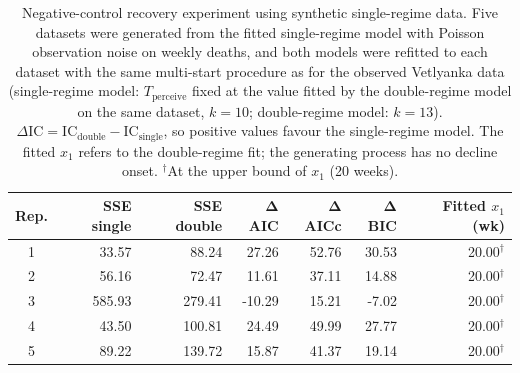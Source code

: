 \begin{table}[t]
    \centering
    \small
    \caption{Negative-control recovery experiment using synthetic single-regime data. Five datasets were generated from the fitted single-regime model with Poisson observation noise on weekly deaths, and both models were refitted to each dataset with the same multi-start procedure as for the observed Vetlyanka data (single-regime model: $T_{\mathrm{perceive}}$ fixed at the value fitted by the double-regime model on the same dataset, $k=10$; double-regime model: $k=13$). $\Delta\mathrm{IC}=\mathrm{IC}_{\mathrm{double}}-\mathrm{IC}_{\mathrm{single}}$, so positive values favour the single-regime model. The fitted $x_1$ refers to the double-regime fit; the generating process has no decline onset. $^{\dagger}$At the upper bound of $x_1$ (20 weeks).}
    \begin{tabular}{crrrrrr}
        \toprule
        \textbf{Rep.} & \textbf{SSE single} & \textbf{SSE double} & $\boldsymbol{\Delta}$\textbf{AIC} & $\boldsymbol{\Delta}$\textbf{AICc} & $\boldsymbol{\Delta}$\textbf{BIC} & \textbf{Fitted $x_1$ (wk)} \\
        \midrule
        1 & 33.57 & 88.24 & 27.26 & 52.76 & 30.53 & 20.00$^{\dagger}$ \\
        2 & 56.16 & 72.47 & 11.61 & 37.11 & 14.88 & 20.00$^{\dagger}$ \\
        3 & 585.93 & 279.41 & -10.29 & 15.21 & -7.02 & 20.00$^{\dagger}$ \\
        4 & 43.50 & 100.81 & 24.49 & 49.99 & 27.77 & 20.00$^{\dagger}$ \\
        5 & 89.22 & 139.72 & 15.87 & 41.37 & 19.14 & 20.00$^{\dagger}$ \\
        \bottomrule
    \end{tabular}
    \label{tab:negative_control_recovery}
\end{table}
